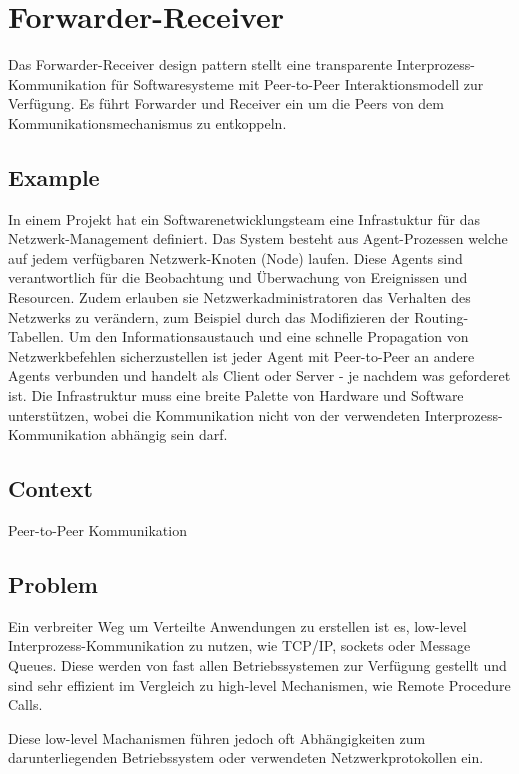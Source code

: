 \section{Forwarder-Receiver}


Das Forwarder-Receiver design pattern stellt eine transparente Interprozess-Kommunikation für Softwaresysteme mit Peer-to-Peer Interaktionsmodell zur Verfügung. Es führt Forwarder und Receiver ein um die Peers von dem Kommunikationsmechanismus zu entkoppeln.

\subsection*{Example}


In einem Projekt hat ein Softwarenetwicklungsteam eine Infrastuktur für das Netzwerk-Management definiert. Das System besteht aus Agent-Prozessen welche auf jedem verfügbaren Netzwerk-Knoten (Node) laufen. Diese Agents sind verantwortlich für die Beobachtung und Überwachung von Ereignissen und Resourcen. Zudem erlauben sie Netzwerkadministratoren das Verhalten des Netzwerks zu verändern, zum Beispiel durch das Modifizieren der Routing-Tabellen. Um den Informationsaustauch und eine schnelle Propagation von Netzwerkbefehlen sicherzustellen ist jeder Agent mit Peer-to-Peer an andere Agents verbunden und handelt als Client oder Server - je nachdem was geforderet ist. Die Infrastruktur muss eine breite Palette von Hardware und Software unterstützen, wobei die Kommunikation nicht von der verwendeten Interprozess-Kommunikation abhängig sein darf.

\subsection*{Context}


Peer-to-Peer Kommunikation

\subsection*{Problem}


Ein verbreiter Weg um Verteilte Anwendungen zu erstellen ist es, low-level Interprozess-Kommunikation zu nutzen, wie TCP/IP, sockets oder Message Queues. Diese werden von fast allen Betriebssystemen zur Verfügung gestellt und sind sehr effizient im Vergleich zu high-level Mechanismen, wie Remote Procedure Calls.

Diese low-level Machanismen führen jedoch oft Abhängigkeiten zum darunterliegenden Betriebssystem oder verwendeten Netzwerkprotokollen ein.

